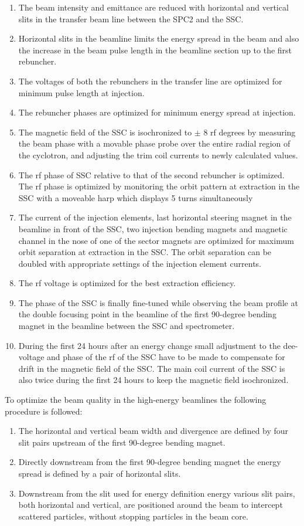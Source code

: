 \documentclass[11pt]{report}
\begin{document}
\begin{enumerate}
\item The beam intensity and emittance are reduced with horizontal and vertical slits in the transfer beam line between the SPC2 and the SSC. 
\item Horizontal slits in the beamline limits the energy spread in the beam and also the increase in the beam pulse length in the beamline section up to the first rebuncher.
\item The voltages of both the rebunchers in the transfer line are optimized for minimum pulse length at injection.
\item The rebuncher phases are optimized for minimum energy spread at injection.
\item The magnetic field of the SSC is isochronized to $\pm$ 8 rf degrees by measuring the beam phase with a movable phase probe over the entire radial region of the cyclotron, and adjusting the trim coil currents to newly calculated values. 
\item The rf phase of SSC relative to that of the second rebuncher is optimized. The rf phase is optimized by monitoring the orbit pattern at extraction in the SSC with a moveable harp which displays 5 turns simultaneously 
\item The current of the injection elements, last horizontal steering magnet in the beamline in front of the SSC, two injection bending magnets and magnetic channel in the nose of one of the sector magnets are optimized for maximum orbit separation at extraction in the SSC. The orbit separation can be doubled with appropriate settings of the injection element currents.
\item The rf voltage is optimized for the best extraction efficiency.
\item The phase of the SSC is finally fine-tuned while observing the beam profile at the double focusing point in the beamline of the first 90-degree bending magnet in the beamline between the SSC and spectrometer.
\item During the first 24 hours after an energy change small adjustment to the dee-voltage and phase of the rf of the SSC have to be made to compensate for drift in the magnetic field of the SSC. The main coil current of the SSC is also twice during the first 24 hours to keep the magnetic field isochronized. 
\end{enumerate}

To optimize the beam quality in the high-energy beamlines the following procedure is followed:
\begin{enumerate}
\item The horizontal and vertical beam width and divergence are defined by four slit pairs upstream of the first 90-degree bending magnet.
\item Directly downstream from the first 90-degree bending magnet the energy spread is defined by a pair of horizontal slits.
\item Downstream from the slit used for energy definition energy various slit pairs, both horizontal and vertical, are positioned around the beam to intercept scattered particles, without stopping particles in the beam core.
\end{enumerate}
\end{document}
